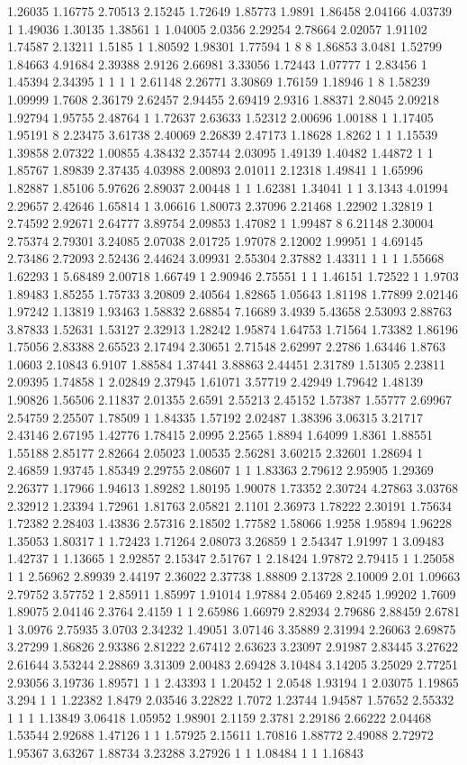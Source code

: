 1.26035 1.16775 2.70513 2.15245 1.72649 1.85773 1.9891 1.86458 2.04166 4.03739 1 1.49036 1.30135 1.38561 1 1.04005 2.0356 2.29254 2.78664 2.02057 1.91102 1.74587 2.13211 1.5185 1 1.80592 1.98301 1.77594 1 8 8 1.86853 3.0481 1.52799 1.84663 4.91684 2.39388 2.9126 2.66981 3.33056 1.72443 1.07777 1 2.83456 1 1.45394 2.34395 1 1 1 1 2.61148 2.26771 3.30869 1.76159 1.18946 1 8 1.58239 1.09999 1.7608 2.36179 2.62457 2.94455 2.69419 2.9316 1.88371 2.8045 2.09218 1.92794 1.95755 2.48764 1 1.72637 2.63633 1.52312 2.00696 1.00188 1 1.17405 1.95191 8 2.23475 3.61738 2.40069 2.26839 2.47173 1.18628 1.8262 1 1 1.15539 1.39858 2.07322 1.00855 4.38432 2.35744 2.03095 1.49139 1.40482 1.44872 1 1 1.85767 1.89839 2.37435 4.03988 2.00893 2.01011 2.12318 1.49841 1 1.65996 1.82887 1.85106 5.97626 2.89037 2.00448 1 1 1.62381 1.34041 1 1 3.1343 4.01994 2.29657 2.42646 1.65814 1 3.06616 1.80073 2.37096 2.21468 1.22902 1.32819 1 2.74592 2.92671 2.64777 3.89754 2.09853 1.47082 1 1.99487 8 6.21148 2.30004 2.75374 2.79301 3.24085 2.07038 2.01725 1.97078 2.12002 1.99951 1 4.69145 2.73486 2.72093 2.52436 2.44624 3.09931 2.55304 2.37882 1.43311 1 1 1 1.55668 1.62293 1 5.68489 2.00718 1.66749 1 2.90946 2.75551 1 1 1.46151 1.72522 1 1.9703 1.89483 1.85255 1.75733 3.20809 2.40564 1.82865 1.05643 1.81198 1.77899 2.02146 1.97242 1.13819 1.93463 1.58832 2.68854 7.16689 3.4939 5.43658 2.53093 2.88763 3.87833 1.52631 1.53127 2.32913 1.28242 1.95874 1.64753 1.71564 1.73382 1.86196 1.75056 2.83388 2.65523 2.17494 2.30651 2.71548 2.62997 2.2786 1.63446 1.8763 1.0603 2.10843 6.9107 1.88584 1.37441 3.88863 2.44451 2.31789 1.51305 2.23811 2.09395 1.74858 1 2.02849 2.37945 1.61071 3.57719 2.42949 1.79642 1.48139 1.90826 1.56506 2.11837 2.01355 2.6591 2.55213 2.45152 1.57387 1.55777 2.69967 2.54759 2.25507 1.78509 1 1.84335 1.57192 2.02487 1.38396 3.06315 3.21717 2.43146 2.67195 1.42776 1.78415 2.0995 2.2565 1.8894 1.64099 1.8361 1.88551 1.55188 2.85177 2.82664 2.05023 1.00535 2.56281 3.60215 2.32601 1.28694 1 2.46859 1.93745 1.85349 2.29755 2.08607 1 1 1.83363 2.79612 2.95905 1.29369 2.26377 1.17966 1.94613 1.89282 1.80195 1.90078 1.73352 2.30724 4.27863 3.03768 2.32912 1.23394 1.72961 1.81763 2.05821 2.1101 2.36973 1.78222 2.30191 1.75634 1.72382 2.28403 1.43836 2.57316 2.18502 1.77582 1.58066 1.9258 1.95894 1.96228 1.35053 1.80317 1 1.72423 1.71264 2.08073 3.26859 1 2.54347 1.91997 1 3.09483 1.42737 1 1.13665 1 2.92857 2.15347 2.51767 1 2.18424 1.97872 2.79415 1 1.25058 1 1 2.56962 2.89939 2.44197 2.36022 2.37738 1.88809 2.13728 2.10009 2.01 1.09663 2.79752 3.57752 1 2.85911 1.85997 1.91014 1.97884 2.05469 2.8245 1.99202 1.7609 1.89075 2.04146 2.3764 2.4159 1 1 2.65986 1.66979 2.82934 2.79686 2.88459 2.6781 1 3.0976 2.75935 3.0703 2.34232 1.49051 3.07146 3.35889 2.31994 2.26063 2.69875 3.27299 1.86826 2.93386 2.81222 2.67412 2.63623 3.23097 2.91987 2.83445 3.27622 2.61644 3.53244 2.28869 3.31309 2.00483 2.69428 3.10484 3.14205 3.25029 2.77251 2.93056 3.19736 1.89571 1 1 2.43393 1 1.20452 1 2.0548 1.93194 1 2.03075 1.19865 3.294 1 1 1.22382 1.8479 2.03546 3.22822 1.7072 1.23744 1.94587 1.57652 2.55332 1 1 1 1.13849 3.06418 1.05952 1.98901 2.1159 2.3781 2.29186 2.66222 2.04468 1.53544 2.92688 1.47126 1 1 1.57925 2.15611 1.70816 1.88772 2.49088 2.72972 1.95367 3.63267 1.88734 3.23288 3.27926 1 1 1.08484 1 1 1.16843 